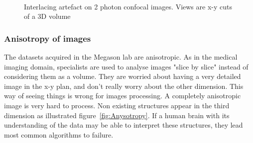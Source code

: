 \begin{figure}[htb]
  \centering
  \\
  \caption{Interlacing artefact on 2 photon confocal images. Views are x-y cuts of a 3D volume}
  \label{fig:InterlacingArtefact}
\end{figure}



\subsubsection{Anisotropy of images}


The datasets acquired in the Megason lab are anisotropic. As in the medical imaging domain, specialists are used to analyse images "slice by slice"
instead of considering them as a volume. They are worried about having a very detailed image in the x-y plan, and don't really worry about the other dimension.
This way of seeing things is wrong for images processing. A completely anisotropic image is very hard to process.
Non existing structures appear in the third dimension as illustrated figure~\ref{fig:Anysotropy}.
If a human brain with its understanding of the data may be able to interpret these structures, they lead most common algorithms to failure.

